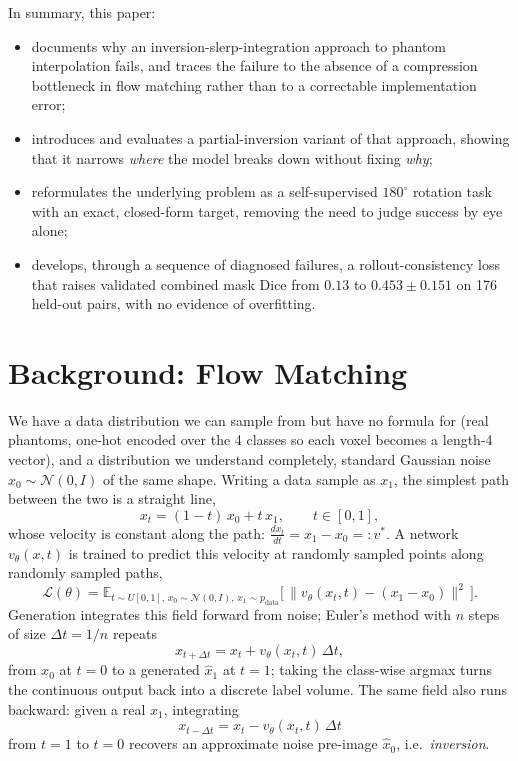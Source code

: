 \documentclass[11pt]{article}
\begin{document}
In summary, this paper:
\begin{itemize}[noitemsep]
\item documents why an inversion-slerp-integration approach to phantom interpolation fails, and
traces the failure to the absence of a compression bottleneck in flow matching rather than to a
correctable implementation error;
\item introduces and evaluates a partial-inversion variant of that approach, showing that it
narrows \emph{where} the model breaks down without fixing \emph{why};
\item reformulates the underlying problem as a self-supervised $180^\circ$ rotation task with an
exact, closed-form target, removing the need to judge success by eye alone;
\item develops, through a sequence of diagnosed failures, a rollout-consistency loss that raises
validated combined mask Dice from $0.13$ to $0.453\pm0.151$ on 176 held-out pairs, with no
evidence of overfitting.
\end{itemize}

\section{Background: Flow Matching}
We have a data distribution we can sample from but have no formula for (real phantoms,
one-hot encoded over the 4 classes so each voxel becomes a length-4 vector), and a distribution
we understand completely, standard Gaussian noise $x_0\sim\mathcal N(0,I)$ of the same shape.
Writing a data sample as $x_1$, the simplest path between the two is a straight line,
\begin{equation}
x_t = (1-t)\,x_0 + t\,x_1, \qquad t\in[0,1], \label{eq:path}
\end{equation}
whose velocity is constant along the path: $\tfrac{d x_t}{dt} = x_1 - x_0 =: v^*$. A network
$v_\theta(x,t)$ is trained to predict this velocity at randomly sampled points along randomly
sampled paths,
\begin{equation}
\mathcal{L}(\theta) = \mathbb{E}_{t\sim U[0,1],\,x_0\sim\mathcal N(0,I),\,x_1\sim p_{\text{data}}}
\Big[\, \|v_\theta(x_t,t) - (x_1-x_0)\|^2 \,\Big]. \label{eq:loss}
\end{equation}
Generation integrates this field forward from noise; Euler's method with $n$ steps of size
$\Delta t = 1/n$ repeats
\begin{equation}
x_{t+\Delta t} = x_t + v_\theta(x_t,t)\,\Delta t, \label{eq:euler-fwd}
\end{equation}
from $x_0$ at $t=0$ to a generated $\hat x_1$ at $t=1$; taking the class-wise argmax turns the
continuous output back into a discrete label volume. The same field also runs backward: given a
real $x_1$, integrating
\begin{equation}
x_{t-\Delta t} = x_t - v_\theta(x_t,t)\,\Delta t \label{eq:euler-bwd}
\end{equation}
from $t=1$ to $t=0$ recovers an approximate noise pre-image $\hat x_0$, i.e.\ \emph{inversion}.
\end{document}
